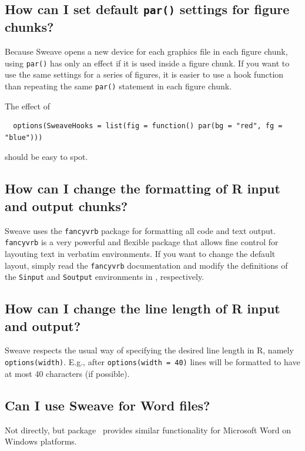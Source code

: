 \documentclass[a4paper]{article}
\begin{document}
 \subsection{How can I set default \texttt{par()} settings for figure
    chunks?}

  Because Sweave opens a new device for each graphics file in each
  figure chunk, using \texttt{par()} has only an effect if it is used
  inside a figure chunk. If you want to use the same settings for a
  series of figures, it is easier to use a hook function than
  repeating the same \texttt{par()} statement in each figure chunk.

  The effect of
\begin{verbatim}
  options(SweaveHooks = list(fig = function() par(bg = "red", fg = "blue")))
\end{verbatim}
  should be easy to spot.

  \subsection{How can I change the formatting of R input and output
     chunks?}

   Sweave uses the \texttt{fancyvrb} package for formatting all \R{} code
   and text output. \texttt{fancyvrb} is a very powerful and flexible
   package that allows fine control for layouting text in verbatim
   environments. If you want to change the default layout, simply read
   the \texttt{fancyvrb} documentation and modify the definitions of
   the \texttt{Sinput} and \texttt{Soutput} environments in
   , respectively.


  \subsection{How can I change the line length of R input and
     output?}

   Sweave respects the usual way of specifying the desired line length
   in R, namely \texttt{options(width)}. E.g., after
   \texttt{options(width = 40)} lines will be formatted to have at most 40
   characters (if possible).


  \subsection{Can I use Sweave for Word files?}

  Not directly, but package~ provides similar
  functionality for Microsoft Word on Windows platforms.
\end{document}
